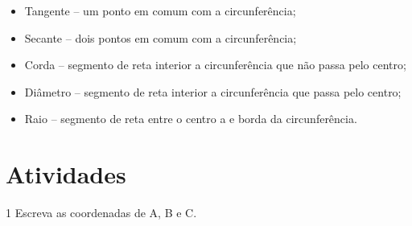 \begin{escolha}
\begin{boxmedio}
\begin{boxmedio}
{\begin{boxpeq}
\begin{boxpeq}
{\begin{boxpeq}
\begin{boxmedio}
\begin{boxmedio}
\begin{boxpeq}
\begin{boxmedio}
\begin{boxpeq}
\begin{boxpeq}
\begin{boxpeq}
\begin{boxpeq}
\begin{boxmedio}
{\begin{boxmedio}
\begin{boxmedio}
\begin{boxpeq}
\begin{boxmedio}
\begin{boxpeq}
\begin{boxpeq}
\begin{boxpeq}
\begin{escolha}
{\begin{boxmedio}
\begin{boxpeq}
\begin{boxpeq}
\begin{boxpeq}
\begin{boxpeq}
\begin{boxpeq}
\begin{boxmedio}
\begin{boxpeq}
\begin{boxpeq}
\begin{boxpeq}
{\begin{boxpeq}
\begin{boxmedio}
\begin{boxpeq}
\begin{boxpeq}
\begin{boxpeq}
{\begin{boxpeq}
\begin{boxmedio}
{\begin{boxpeq}
\begin{boxpeq}
\begin{boxmedio}
\begin{boxmedio}
\begin{boxpeq}
\begin{boxpeq}
{\begin{boxpeq}
{\begin{itemize}
\begin{itemize}
\item
  Tangente -- um ponto em comum com a circunferência;
\item
  Secante -- dois pontos em comum com a circunferência;
\item
  Corda -- segmento de reta interior a circunferência que não passa pelo
  centro;
\item
  Diâmetro -- segmento de reta interior a circunferência que passa pelo
  centro;
\item
  Raio -- segmento de reta entre o centro a e borda da circunferência.
\end{itemize}

\end{itemize}
} 

\section{Atividades}

\num{1} Escreva as coordenadas de A, B e C.


\end{boxpeq}}
\end{boxpeq}
\end{boxpeq}
\end{boxmedio}
\end{boxmedio}
\end{boxpeq}
\end{boxpeq}}
\end{boxmedio}
\end{boxpeq}}
\end{boxpeq}
\end{boxpeq}
\end{boxpeq}
\end{boxmedio}
\end{boxpeq}}
\end{boxpeq}
\end{boxpeq}
\end{boxpeq}
\end{boxmedio}
\end{boxpeq}
\end{boxpeq}
\end{boxpeq}
\end{boxpeq}
\end{boxpeq}
\end{boxmedio}}
\end{escolha}
\end{boxpeq}
\end{boxpeq}
\end{boxpeq}
\end{boxmedio}
\end{boxpeq}
\end{boxmedio}
\end{boxmedio}}
\end{boxmedio}
\end{boxpeq}
\end{boxpeq}
\end{boxpeq}
\end{boxpeq}
\end{boxmedio}
\end{boxpeq}
\end{boxmedio}
\end{boxmedio}
\end{boxpeq}}
\end{boxpeq}
\end{boxpeq}}
\end{boxmedio}
\end{boxmedio}
\end{escolha}
